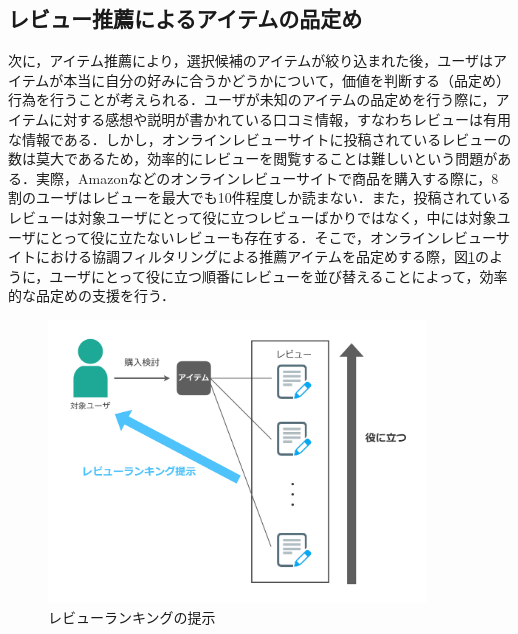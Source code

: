 \documentclass[a4paper,11pt,oneside,openany]{jsbook}
\begin{document}
\subsection{レビュー推薦によるアイテムの品定め}

次に，アイテム推薦により，選択候補のアイテムが絞り込まれた後，ユーザはアイテムが本当に自分の好みに合うかどうかについて，価値を判断する（品定め）行為を行うことが考えられる．ユーザが未知のアイテムの品定めを行う際に，アイテムに対する感想や説明が書かれている口コミ情報，すなわちレビューは有用な情報である．しかし，オンラインレビューサイトに投稿されているレビューの数は莫大であるため，効率的にレビューを閲覧することは難しいという問題がある．実際，Amazonなどのオンラインレビューサイトで商品を購入する際に，8割のユーザはレビューを最大でも10件程度しか読まない\cite{review_effect}．また，投稿されているレビューは対象ユーザにとって役に立つレビューばかりではなく，中には対象ユーザにとって役に立たないレビューも存在する．そこで，オンラインレビューサイトにおける協調フィルタリングによる推薦アイテムを品定めする際，図\ref{fig:ranking_image}のように，ユーザにとって役に立つ順番にレビューを並び替えることによって，効率的な品定めの支援を行う．
\begin{figure}[htb]
	\begin{center} %
		\includegraphics[width = 100mm]{figures/ranking_image.pdf} %
	\end{center}
	\caption{レビューランキングの提示} %
	\label{fig:ranking_image} %
\end{figure}
\end{document}
